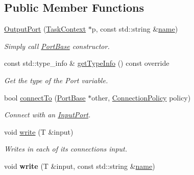 \subsection*{Public Member Functions}
\begin{DoxyCompactItemize}
\item 
\hypertarget{classcoco_1_1_output_port_a3f9c807795a223f1b5d74149e6b96b41}{}\hyperlink{classcoco_1_1_output_port_a3f9c807795a223f1b5d74149e6b96b41}{Output\+Port} (\hyperlink{classcoco_1_1_task_context}{Task\+Context} $\ast$p, const std\+::string \&\hyperlink{classcoco_1_1_port_base_abf4eb7fcc3ec9973ee73dd140e7646db}{name})\label{classcoco_1_1_output_port_a3f9c807795a223f1b5d74149e6b96b41}

\begin{DoxyCompactList}\small\item\em Simply call \hyperlink{classcoco_1_1_port_base}{Port\+Base} constructor. \end{DoxyCompactList}\item 
\hypertarget{classcoco_1_1_output_port_af98baef0b2f5e221b1023bfab6bbad57}{}const std\+::type\+\_\+info \& \hyperlink{classcoco_1_1_output_port_af98baef0b2f5e221b1023bfab6bbad57}{get\+Type\+Info} () const override\label{classcoco_1_1_output_port_af98baef0b2f5e221b1023bfab6bbad57}

\begin{DoxyCompactList}\small\item\em Get the type of the Port variable. \end{DoxyCompactList}\item 
\hypertarget{classcoco_1_1_output_port_a017669d64d3345abab16c2f046326147}{}bool \hyperlink{classcoco_1_1_output_port_a017669d64d3345abab16c2f046326147}{connect\+To} (\hyperlink{classcoco_1_1_port_base}{Port\+Base} $\ast$other, \hyperlink{structcoco_1_1_connection_policy}{Connection\+Policy} policy)\label{classcoco_1_1_output_port_a017669d64d3345abab16c2f046326147}

\begin{DoxyCompactList}\small\item\em Connect with an \hyperlink{classcoco_1_1_input_port}{Input\+Port}. \end{DoxyCompactList}\item 
\hypertarget{classcoco_1_1_output_port_a0605797751243903e6392b5814093e03}{}void \hyperlink{classcoco_1_1_output_port_a0605797751243903e6392b5814093e03}{write} (T \&input)\label{classcoco_1_1_output_port_a0605797751243903e6392b5814093e03}

\begin{DoxyCompactList}\small\item\em Writes in each of its connections {\ttfamily input}. \end{DoxyCompactList}\item 
\hypertarget{classcoco_1_1_output_port_a124e9820fb88d0497d99fdf0b3bd6f9c}{}void {\bfseries write} (T \&input, const std\+::string \&\hyperlink{classcoco_1_1_port_base_abf4eb7fcc3ec9973ee73dd140e7646db}{name})\label{classcoco_1_1_output_port_a124e9820fb88d0497d99fdf0b3bd6f9c}

\end{DoxyCompactItemize}

